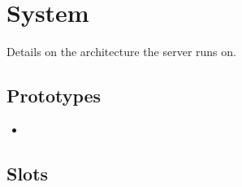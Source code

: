 \section{System}
Details on the architecture the \urbi server runs on.

\subsection{Prototypes}
\begin{itemize}
\item {}
\end{itemize}

\subsection{Slots}
\begin{itemize}


\end{itemize}
